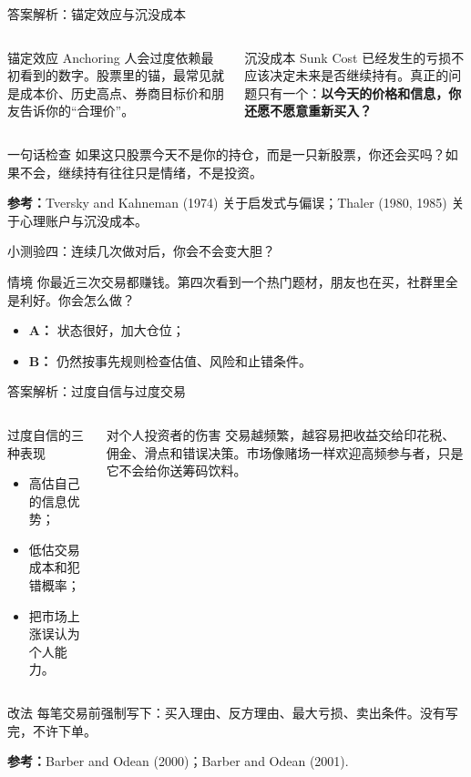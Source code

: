 \documentclass[UTF8,aspectratio=169,11pt]{ctexbeamer}
\newcommand{\source}[1]{\vfill{\scriptsize\color{aqgray}\textbf{参考：}#1}}
\begin{document}
\begin{frame}{答案解析：锚定效应与沉没成本}
\begin{columns}[T,totalwidth=\textwidth]
\begin{keybox}{锚定效应 Anchoring}
\small
人会过度依赖最初看到的数字。股票里的锚，最常见就是成本价、历史高点、券商目标价和朋友告诉你的“合理价”。
\end{keybox}
\begin{riskbox}{沉没成本 Sunk Cost}
\small
已经发生的亏损不应该决定未来是否继续持有。真正的问题只有一个：\textbf{以今天的价格和信息，你还愿不愿意重新买入？}
\end{riskbox}
\end{columns}
\vspace{0.25cm}
\begin{casebox}{一句话检查}
如果这只股票今天不是你的持仓，而是一只新股票，你还会买吗？如果不会，继续持有往往只是情绪，不是投资。
\end{casebox}
\source{Tversky and Kahneman (1974) 关于启发式与偏误；Thaler (1980, 1985) 关于心理账户与沉没成本。}
\end{frame}

\begin{frame}{小测验四：连续几次做对后，你会不会变大胆？}
\begin{casebox}{情境}
\small
你最近三次交易都赚钱。第四次看到一个热门题材，朋友也在买，社群里全是利好。你会怎么做？
\begin{itemize}
\item \textbf{A：} 状态很好，加大仓位；
\item \textbf{B：} 仍然按事先规则检查估值、风险和止错条件。
\end{itemize}
\end{casebox}
\end{frame}

\begin{frame}{答案解析：过度自信与过度交易}
\begin{columns}[T,totalwidth=\textwidth]
\begin{keybox}{过度自信的三种表现}
\small
\begin{itemize}
\item 高估自己的信息优势；
\item 低估交易成本和犯错概率；
\item 把市场上涨误认为个人能力。
\end{itemize}
\end{keybox}
\begin{riskbox}{对个人投资者的伤害}
\small
交易越频繁，越容易把收益交给印花税、佣金、滑点和错误决策。市场像赌场一样欢迎高频参与者，只是它不会给你送筹码饮料。
\end{riskbox}
\end{columns}
\vspace{0.25cm}
\begin{casebox}{改法}
每笔交易前强制写下：买入理由、反方理由、最大亏损、卖出条件。没有写完，不许下单。
\end{casebox}
\source{Barber and Odean (2000)；Barber and Odean (2001).}
\end{frame}
\end{document}
